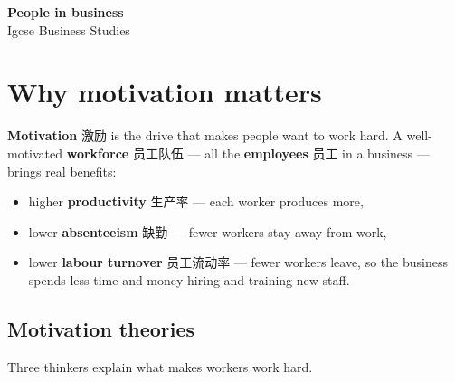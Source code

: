 \documentclass[11pt]{article}
\begin{document}
\begin{center}
  {\LARGE\bfseries People in business}\\[0.35em]
  {\large Igcse Business Studies}
\end{center}
\vspace{0.6em}

\section*{Why motivation matters}

\textbf{Motivation} 激励 is the drive that makes people want to work hard. A well-motivated \textbf{workforce} 员工队伍 — all the \textbf{employees} 员工 in a business — brings real benefits:

\begin{itemize}
\item higher \textbf{productivity} 生产率 — each worker produces more,

\item lower \textbf{absenteeism} 缺勤 — fewer workers stay away from work,

\item lower \textbf{labour turnover} 员工流动率 — fewer workers leave, so the business spends less time and money hiring and training new staff.

\end{itemize}

\subsection*{Motivation theories}

Three thinkers explain what makes workers work hard.

\begin{center}
\end{center}
\end{document}
